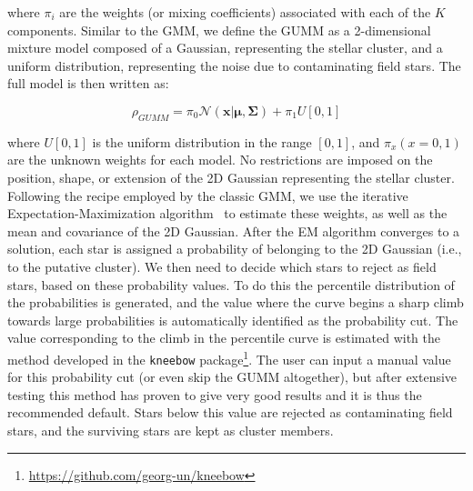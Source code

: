 \documentclass{aa}
\begin{document}
 \noindent where $\pi_i$ are the weights (or mixing coefficients)
 associated with each of the $K$ components. Similar to the GMM, we define the
 GUMM as a 2-dimensional mixture model composed of a Gaussian, representing
 the stellar cluster, and a uniform distribution, representing the noise due
 to contaminating field stars. The full model is then written as:

 \begin{equation}
 \rho_{GUMM}=
 \pi_{0} \mathcal{N}\left(\boldsymbol{\mathbf{x} | \mu}, \boldsymbol{\Sigma}\right)+
 \pi_{1} U[0,1]
 \end{equation}

 \noindent where $U[0,1]$ is the uniform distribution in the range $[0,1]$,
 and $\pi_{x} (x=0,1)$ are the unknown weights for each model.
 No restrictions are imposed on the position, shape, or
 extension of the 2D Gaussian representing the stellar cluster.
 Following the recipe employed by the classic GMM, we use the
 iterative Expectation-Maximization algorithm~\citep[EM,][]{dempster_1977} to
 estimate these  weights, as well as the mean and covariance of the 2D
 Gaussian. After the EM algorithm converges to a solution, each star is
 assigned a probability of belonging to the 2D Gaussian 
 (i.e., to the putative cluster). We then need to decide which stars to reject
 as field stars, based on these probability values. To do this the percentile
 distribution of the probabilities is generated, and the value
 where the curve begins a sharp climb towards large probabilities is
 automatically identified as the probability cut. The value
 corresponding to the climb in the percentile curve is estimated with the
 method developed in the \texttt{kneebow} package\footnote{
 \url{https://github.com/georg-un/kneebow}}. The user can input a
 manual value for this probability cut (or even skip the GUMM altogether), but
 after extensive testing this method has proven to give very good results and
 it is thus the recommended default.
 Stars below this value are rejected as contaminating field stars, and the
 surviving stars are kept as cluster members.
\end{document}
